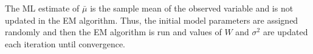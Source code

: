 The ML estimate of $\bar{\mu}$ is the sample mean of the observed variable and is not updated in the EM algorithm. Thus, the initial model parameters are assigned randomly and then the EM algorithm is run and values of $W$ and $\sigma^2$ are updated each iteration until convergence. 






